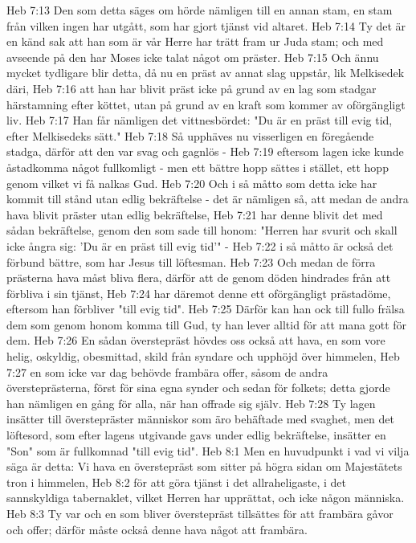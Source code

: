 Heb 7:13  Den som detta säges om hörde nämligen till en annan stam, en stam från vilken ingen har utgått, som har gjort tjänst vid altaret.
Heb 7:14  Ty det är en känd sak att han som är vår Herre har trätt fram ur Juda stam; och med avseende på den har Moses icke talat något om präster.
Heb 7:15  Och ännu mycket tydligare blir detta, då nu en präst av annat slag uppstår, lik Melkisedek däri,
Heb 7:16  att han har blivit präst icke på grund av en lag som stadgar härstamning efter köttet, utan på grund av en kraft som kommer av oförgängligt liv.
Heb 7:17  Han får nämligen det vittnesbördet: "Du är en präst till evig tid, efter Melkisedeks sätt."
Heb 7:18  Så upphäves nu visserligen en föregående stadga, därför att den var svag och gagnlös -
Heb 7:19  eftersom lagen icke kunde åstadkomma något fullkomligt - men ett bättre hopp sättes i stället, ett hopp genom vilket vi få nalkas Gud.
Heb 7:20  Och i så måtto som detta icke har kommit till stånd utan edlig bekräftelse - det är nämligen så, att medan de andra hava blivit präster utan edlig bekräftelse,
Heb 7:21  har denne blivit det med sådan bekräftelse, genom den som sade till honom: "Herren har svurit och skall icke ångra sig: 'Du är en präst till evig tid'" -
Heb 7:22  i så måtto är också det förbund bättre, som har Jesus till löftesman.
Heb 7:23  Och medan de förra prästerna hava måst bliva flera, därför att de genom döden hindrades från att förbliva i sin tjänst,
Heb 7:24  har däremot denne ett oförgängligt prästadöme, eftersom han förbliver "till evig tid".
Heb 7:25  Därför kan han ock till fullo frälsa dem som genom honom komma till Gud, ty han lever alltid för att mana gott för dem.
Heb 7:26  En sådan överstepräst hövdes oss också att hava, en som vore helig, oskyldig, obesmittad, skild från syndare och upphöjd över himmelen,
Heb 7:27  en som icke var dag behövde frambära offer, såsom de andra översteprästerna, först för sina egna synder och sedan för folkets; detta gjorde han nämligen en gång för alla, när han offrade sig själv.
Heb 7:28  Ty lagen insätter till överstepräster människor som äro behäftade med svaghet, men det löftesord, som efter lagens utgivande gavs under edlig bekräftelse, insätter en "Son" som är fullkomnad "till evig tid".
Heb 8:1  Men en huvudpunkt i vad vi vilja säga är detta: Vi hava en överstepräst som sitter på högra sidan om Majestätets tron i himmelen,
Heb 8:2  för att göra tjänst i det allraheligaste, i det sannskyldiga tabernaklet, vilket Herren har upprättat, och icke någon människa.
Heb 8:3  Ty var och en som bliver överstepräst tillsättes för att frambära gåvor och offer; därför måste också denne hava något att frambära.
